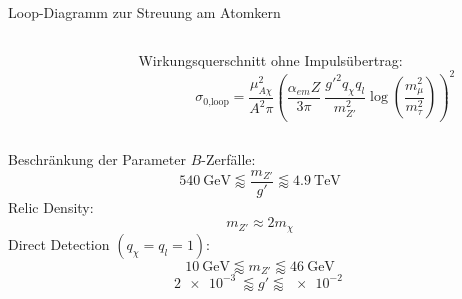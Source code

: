 \begin{frame}{Loop-Diagramm zur Streuung am Atomkern}
\begin{columns}
\begin{column}{.35\textwidth}
		\resizebox{\textwidth}{!}{
			
		}
\end{column}
\begin{column}{.65\textwidth}
	Wirkungsquerschnitt ohne Impulsübertrag:
	\[ \sigma_\text{0,loop} = \frac{\mu_{A\chi}^2}{A^2\pi}\left(\frac{\alpha_{em}Z}{3\pi}\ \frac{g'^2q_\chi q_l}{m_{Z'}^2}\log\left(\frac{m_\mu^2}{m_\tau^2}\right)\right)^2 \]
\end{column}
\end{columns}
\end{frame}


\begin{frame}{Beschränkung der Parameter}
$B$-Zerfälle:
	\[ \SI{540}{\giga\electronvolt}\lessapprox\frac{m_{Z'}}{g'}\lessapprox\SI{4.9}{\tera\electronvolt} \]
Relic Density:
	\[ m_{Z'}\approx 2m_\chi \]
Direct Detection $(q_\chi=q_l=1)$:
	\[ \SI{10}{\giga\electronvolt}\lessapprox m_{Z'} \lessapprox\SI{46}{\giga\electronvolt} \]
	\[ \SI{2e-3}{}\lessapprox g' \lessapprox\SI{e-2}{} \]
\end{frame}
